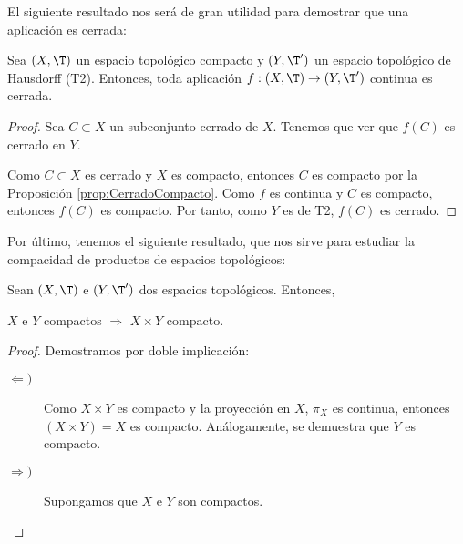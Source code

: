 El siguiente resultado nos será de gran utilidad para demostrar que una aplicación es cerrada:
\begin{teo}\label{teo:ContinuaEntoncesCerrada}
    Sea $(X,\T)$ un espacio topológico compacto y $(Y,\T')$ un espacio topológico de Hausdorff (T2).
    Entonces, toda aplicación $f:(X,\T)\to (Y,\T')$ continua es cerrada.
\end{teo}
\begin{proof}
    Sea $C\subset X$ un subconjunto cerrado de $X$. Tenemos que ver que $f(C)$ es cerrado en $Y$.
    
    Como $C\subset X$ es cerrado y $X$ es compacto, entonces $C$ es compacto por la Proposición \ref{prop:CerradoCompacto}.
    Como $f$ es continua y $C$ es compacto, entonces $f(C)$ es compacto. Por tanto, como $Y$ es de T2, $f(C)$ es cerrado.
\end{proof}


Por último, tenemos el siguiente resultado, que nos sirve para estudiar la compacidad de productos de espacios topológicos:
\begin{teo} \label{teo:Tychonoff}
    Sean $(X,\T)$ e $(Y,\T')$ dos espacios topológicos. Entonces,
    \begin{center}
        $X$ e $Y$ compactos $\Longrightarrow$ $X\times Y$ compacto.
    \end{center}
\end{teo}
\begin{proof}
    Demostramos por doble implicación:
    \begin{description}
        \item[$\Longleftarrow)$] Como $X\times Y$ es compacto y la proyección en $X$, $\pi_X$ es continua, entonces $(X\times Y)=X$ es compacto.
        Análogamente, se demuestra que $Y$ es compacto.
        
        \item[$\Longrightarrow)$] %
        
        Supongamos que $X$ e $Y$ son compactos.
        
        \begin{comment}
        Demostraremos que todo recubrimiento de $X\times Y$ por abiertos básicos de $\T\times \T'$
        tiene un subrecubrimiento finito. Para ello, sea \{$U_i\times V_i$\}$_{i\in I}$ un recubrimiento de $X\times Y$ por abiertos básicos de $\T\times \T'$,
        es decir, $U_i\in \T$, $V_i\in \T'$ $\forall i\in I$ y:
        \begin{equation*}
            X\times Y = \bigcup_{i\in I}U_i\times V_i
        \end{equation*}
        \end{comment}
    \end{description}
\end{proof}



